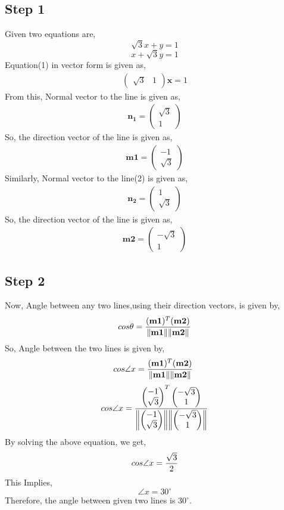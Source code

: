 \documentclass[10pt, a4paper]{article}
\newcommand{\myvec}[1]{\ensuremath{\begin{pmatrix}#1\end{pmatrix}}}
\let\vec\mathbf
\begin{document}
   \subsection*{Step 1}
   Given two equations are, \\
   \begin{equation}
   \sqrt{3}x+y=1 
   \end{equation}
   \begin{equation}
   x+\sqrt{3}y=1 
   \end{equation}
   Equation(1) in vector form is given as,
   \begin{align}
   \myvec{\sqrt{3}&1}\vec{x}=1
   \end{align}
   From this, Normal vector to the line is given as,
   \begin{align*}
   \vec{n_1}=\myvec{\sqrt{3}\\1}
   \end{align*}
   So, the direction vector of the line is given as,
\begin{eqnarray*}
   \vec{m1}=\myvec{-1\\\sqrt{3}}
\end{eqnarray*} 
Similarly, Normal vector to the line(2) is given as,
   \begin{align*}
   \vec{n_2}=\myvec{1\\\sqrt{3}}
   \end{align*}
   So, the direction vector of the line is given as,
\begin{eqnarray*}
   \vec{m2}=\myvec{-\sqrt{3}\\1}
\end{eqnarray*}     

\subsection*{Step 2}
Now, Angle between any two lines,using their direction vectors, is given by, \\
\begin{eqnarray*}
 cos\theta=\frac{(\vec{m1})^T(\vec{m2})}{\norm{\vec{m1}}\norm{\vec{m2}}}
\end{eqnarray*}
So, Angle between the two lines is given by,
\begin{eqnarray}
 cos\angle{x}=\frac{(\vec{m1})^T(\vec{m2})}{\norm{\vec{m1}}\norm{\vec{m2}}}\
\end{eqnarray}
\begin{eqnarray}
 cos\angle{x}=\frac{\myvec{-1\\\sqrt{3}}^T\myvec{-\sqrt{3}\\1}}{\norm{\myvec{-1\\\sqrt{3}}}\norm{\myvec{-\sqrt{3}\\1}}}
\end{eqnarray}
By solving the above equation, we get, \\
\begin{equation}
cos\angle{x}=\frac{\sqrt{3}}{2} \\
\end{equation}
This Implies,
\begin{equation*}
\angle{x}=30^\circ
\end{equation*}
Therefore, the angle between given two lines is $30^\circ$. \\

\end{document}
